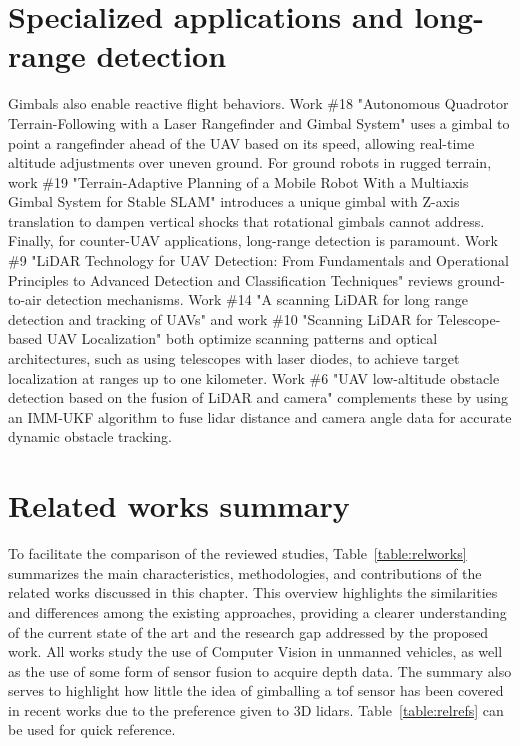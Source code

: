 \section{Specialized applications and long-range detection}

Gimbals also enable reactive flight behaviors. Work \#18 "Autonomous Quadrotor
Terrain-Following with a Laser Rangefinder and Gimbal System" \cite{rel18} uses a gimbal
to point a rangefinder ahead of the UAV based on its speed, allowing real-time altitude
adjustments over uneven ground.
For ground robots in rugged terrain, work \#19 "Terrain-Adaptive Planning of a Mobile
Robot With a Multiaxis Gimbal System for Stable SLAM" \cite{rel19} introduces a unique
gimbal with Z-axis translation to dampen vertical shocks that rotational gimbals cannot
address. Finally, for counter-UAV applications, long-range detection is paramount.
Work \#9 "LiDAR Technology for UAV Detection: From Fundamentals and Operational Principles
to Advanced Detection and Classification Techniques" \cite{rel9} reviews ground-to-air
detection mechanisms.
Work \#14 "A scanning LiDAR for long range detection and tracking of UAVs" \cite{rel14}
and work \#10 "Scanning LiDAR for Telescope-based UAV Localization" \cite{rel10} both
optimize scanning patterns and optical architectures, such as using telescopes with laser
diodes, to achieve target localization at ranges up to one kilometer.
Work \#6 "UAV low-altitude obstacle detection based on the fusion of LiDAR and camera"
\cite{rel6} complements these by using an IMM-UKF algorithm to fuse \gls{lidar} distance and
camera angle data for accurate dynamic obstacle tracking.

\section{Related works summary}

To facilitate the comparison of the reviewed studies, Table~\ref{table:relworks} summarizes
the main characteristics, methodologies, and contributions of the related works discussed
in this chapter. This overview highlights the similarities and differences among the
existing approaches, providing a clearer understanding of the current state of the art
and the research gap addressed by the proposed work. All works study the use of Computer
Vision in unmanned vehicles, as well as the use of some form of sensor fusion to acquire
depth data. The summary also serves to highlight how little the idea of gimballing a
\gls{tof} sensor has been covered in recent works due to the preference given to 3D
\gls{lidar}s. Table~\ref{table:relrefs} can be used for quick reference.

